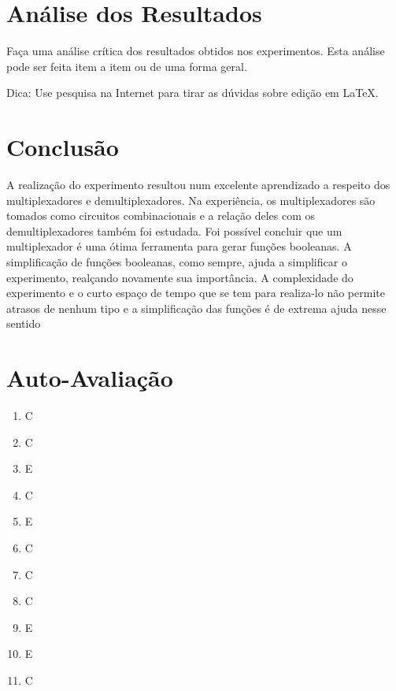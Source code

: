 \documentclass[12pt]{article}
\begin{document}
\section{Análise dos Resultados}
\label{sec:Resultados}

Faça uma análise crítica dos resultados obtidos nos experimentos. Esta análise pode ser feita item a item ou de uma forma geral.

Dica: Use pesquisa na Internet para tirar as dúvidas sobre edição em \LaTeX .

\section{Conclusão}
\label{sec:Conclusao}

A realização do experimento resultou num excelente aprendizado a respeito dos multiplexadores e demultiplexadores. Na experiência, os multiplexadores são tomados como circuitos combinacionais e a relação deles com os demultiplexadores também foi estudada.
Foi possível concluir que um multiplexador é uma ótima ferramenta para gerar funções booleanas. A simplificação de funções booleanas, como sempre, ajuda a simplificar o experimento, realçando novamente sua importância. A complexidade do experimento e o curto espaço de tempo que se tem para realiza-lo não permite atrasos de nenhum tipo e a simplificação das funções é de extrema ajuda nesse sentido

\newpage 
\section*{Auto-Avaliação}

\begin{enumerate}
    \item C
    \item C
    \item E
    \item C
    \item E
    \item C
    \item C
    \item C
    \item E
    \item E
    \item C
\end{enumerate}
\end{document}

